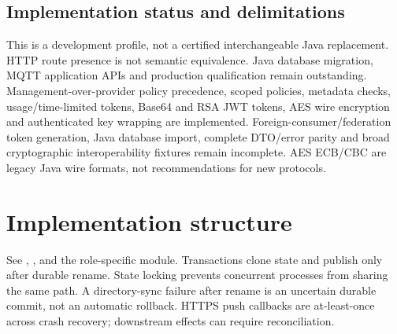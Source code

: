 \documentclass[a4paper]{arrowhead}
\begin{document}
\subsection{Implementation status and delimitations}
This is a development profile, not a certified interchangeable Java replacement. HTTP route presence is not semantic equivalence. Java database migration, MQTT application APIs and production qualification remain outstanding.
Management-over-provider policy precedence, scoped policies, metadata checks, usage/time-limited tokens, Base64 and RSA JWT tokens, AES wire encryption and authenticated key wrapping are implemented. Foreign-consumer/federation token generation, Java database import, complete DTO/error parity and broad cryptographic interoperability fixtures remain incomplete. AES ECB/CBC are legacy Java wire formats, not recommendations for new protocols.
\section{Implementation structure}
See , ,  and the role-specific module. Transactions clone state and publish only after durable rename. State locking prevents concurrent processes from sharing the same path. A directory-sync failure after rename is an uncertain durable commit, not an automatic rollback. HTTPS push callbacks are at-least-once across crash recovery; downstream effects can require reconciliation.
\end{document}
